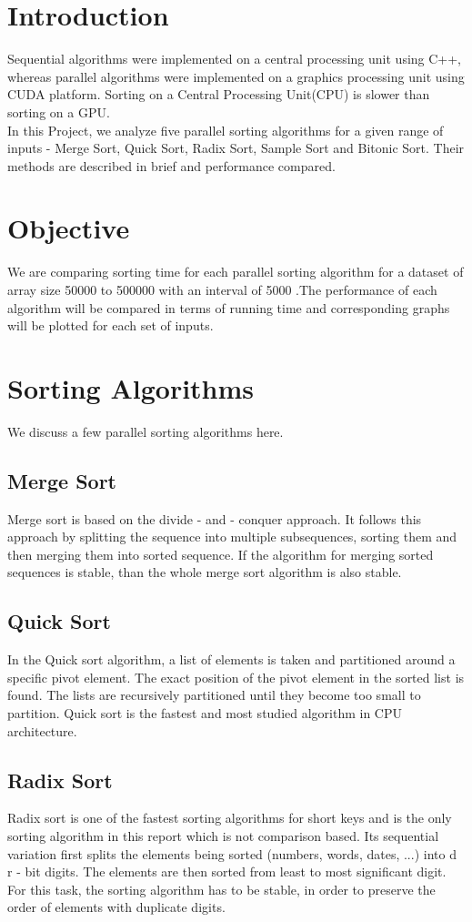 \documentclass[conference]{IEEEtran}
\begin{document}
\section{Introduction}
Sequential algorithms were implemented on a central processing unit using C++, whereas parallel algorithms were implemented on a graphics processing unit using CUDA platform. Sorting on a Central Processing Unit(CPU) is slower than sorting on a GPU.\\ 
In this Project, we analyze five parallel sorting algorithms for a given range of inputs - Merge Sort, Quick Sort, Radix Sort, Sample Sort and Bitonic Sort. Their methods are described in brief and performance compared.

\section{Objective}
We are comparing sorting time for each parallel sorting algorithm for a dataset of array size 50000 to 500000 with an interval of 5000 .The performance of each algorithm will be compared in terms of running time and corresponding graphs will be plotted for each set of inputs. 

\section{Sorting Algorithms}
We discuss a few parallel sorting algorithms here.
\subsection{Merge Sort}
Merge sort is based on the divide - and - conquer approach. It follows this approach by splitting the sequence into multiple subsequences, sorting them and then merging them into sorted sequence. If the algorithm for merging sorted sequences is stable, than the whole merge sort algorithm is also stable.

\subsection{Quick Sort}
In the Quick sort algorithm, a list of elements is taken and partitioned around a specific pivot element. The exact position of the pivot element in the sorted list is found. The lists are recursively partitioned until they become too small to partition. Quick sort is the fastest and most studied algorithm in CPU architecture.

\subsection{Radix Sort}
Radix sort is one of the fastest sorting algorithms for short keys and is the only sorting algorithm in this report which is not comparison based. Its sequential variation first splits the elements being sorted (numbers, words, dates, ...) into d r - bit digits. The elements are then sorted from least to most significant digit. For this task, the sorting algorithm has to be stable, in order to preserve the order of elements with duplicate digits.
\end{document}
